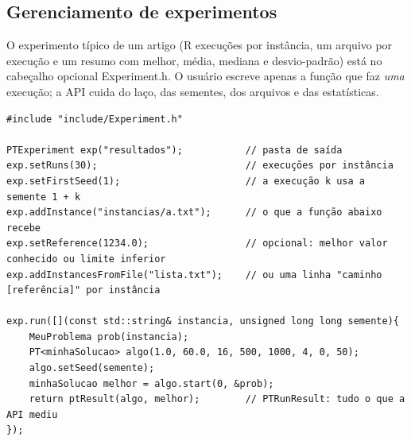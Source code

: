 \documentclass[10pt,a4paper]{article}
\newcommand{\code}[1]{{\ttfamily #1}}
\begin{document}
\subsection{Gerenciamento de experimentos}

O experimento típico de um artigo (R execuções por instância, um arquivo por execução e um resumo com melhor, média, mediana e desvio-padrão) está no cabeçalho opcional \code{Experiment.h}. O usuário escreve apenas a função que faz \textit{uma} execução; a API cuida do laço, das sementes, dos arquivos e das estatísticas.

\begin{lstlisting}[style=cpp]
#include "include/Experiment.h"

PTExperiment exp("resultados");           // pasta de saída
exp.setRuns(30);                          // execuções por instância
exp.setFirstSeed(1);                      // a execução k usa a semente 1 + k
exp.addInstance("instancias/a.txt");      // o que a função abaixo recebe
exp.setReference(1234.0);                 // opcional: melhor valor conhecido ou limite inferior
exp.addInstancesFromFile("lista.txt");    // ou uma linha "caminho [referência]" por instância

exp.run([](const std::string& instancia, unsigned long long semente){
    MeuProblema prob(instancia);
    PT<minhaSolucao> algo(1.0, 60.0, 16, 500, 1000, 4, 0, 50);
    algo.setSeed(semente);
    minhaSolucao melhor = algo.start(0, &prob);
    return ptResult(algo, melhor);        // PTRunResult: tudo o que a API mediu
});
\end{lstlisting}
\end{document}
